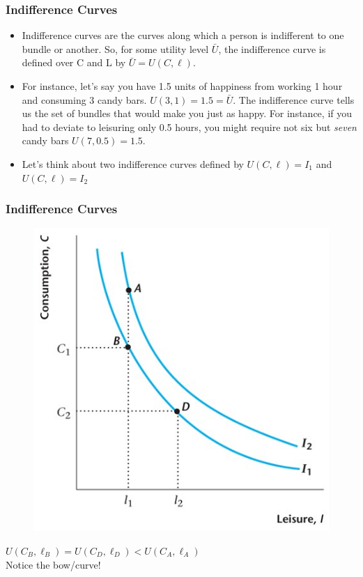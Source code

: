 \documentclass{beamer}
\begin{document}
\begin{frame}
\frametitle[alignment=center]{Indifference Curves}
\begin{itemize}
\item Indifference curves are the curves along which a person is indifferent to one bundle or another.  So, for some utility level $\bar{U}$, the indifference curve is defined over C and L by $\bar{U}=U(C,\ell)$.
\bigskip
\item For instance, let's say you have 1.5 units of happiness from working 1 hour and consuming 3 candy bars.  $U(3,1)=1.5=\bar{U}$.  The indifference curve tells us the set of bundles that would make you just as happy.  For instance, if you had to deviate to leisuring only 0.5 hours, you might require not six but \emph{seven} candy bars $U(7,0.5)=1.5$.  
\bigskip
\item Let's think about two indifference curves defined by $U(C,\ell)=I_1$ and  $U(C,\ell)=I_2$
\end{itemize}
\end{frame}

\begin{frame}
\frametitle[alignment=center]{Indifference Curves}
\begin{figure}
\centering
\includegraphics[scale=0.5]{Figures/W_Fig_4pt1.png}
\end{figure}
$U(C_B,\ell_B)=U(C_D,\ell_D)<U(C_A,\ell_A)$\\
Notice the bow/curve!
\end{frame}
\end{document}
